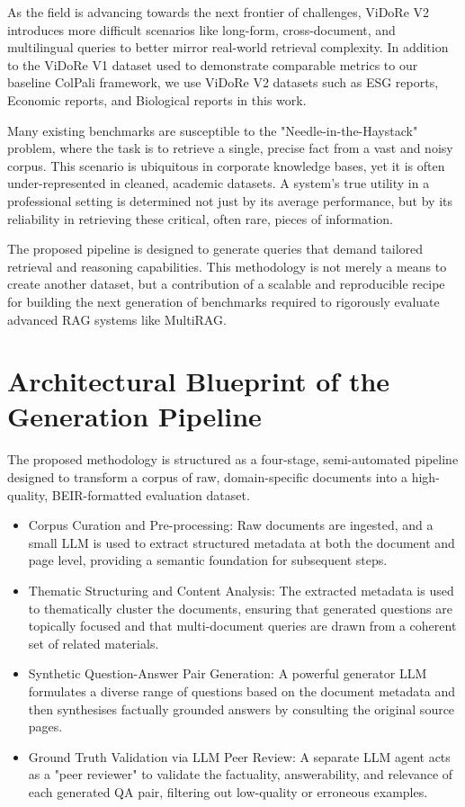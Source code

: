 \documentclass[12pt,twoside]{report}
\begin{document}
As the field is advancing towards the next frontier of challenges, ViDoRe V2 introduces more difficult scenarios like long-form, cross-document, and multilingual queries to better mirror real-world retrieval complexity. In addition to the ViDoRe V1 dataset used to demonstrate comparable metrics to our baseline ColPali framework, we use ViDoRe V2 datasets such as ESG reports, Economic reports, and Biological reports in this work.

Many existing benchmarks are susceptible to the "Needle-in-the-Haystack" problem, where the task is to retrieve a single, precise fact from a vast and noisy corpus. This scenario is ubiquitous in corporate knowledge bases, yet it is often under-represented in cleaned, academic datasets. A system's true utility in a professional setting is determined not just by its average performance, but by its reliability in retrieving these critical, often rare, pieces of information.

The proposed pipeline is designed to generate queries that demand tailored retrieval and reasoning capabilities. This methodology is not merely a means to create another dataset, but a contribution of a scalable and reproducible recipe for building the next generation of benchmarks required to rigorously evaluate advanced RAG systems like MultiRAG.

\section{Architectural Blueprint of the Generation Pipeline}

The proposed methodology is structured as a four-stage, semi-automated pipeline designed to transform a corpus of raw, domain-specific documents into a high-quality, BEIR-formatted evaluation dataset.

\begin{itemize}
\item{Corpus Curation and Pre-processing}: Raw documents are ingested, and a small LLM is used to extract structured metadata at both the document and page level, providing a semantic foundation for subsequent steps.

\item{Thematic Structuring and Content Analysis}: The extracted metadata is used to thematically cluster the documents, ensuring that generated questions are topically focused and that multi-document queries are drawn from a coherent set of related materials.

\item{Synthetic Question-Answer Pair Generation}: A powerful generator LLM formulates a diverse range of questions based on the document metadata and then synthesises factually grounded answers by consulting the original source pages.

\item{Ground Truth Validation via LLM Peer Review}: A separate LLM agent acts as a "peer reviewer" to validate the factuality, answerability, and relevance of each generated QA pair, filtering out low-quality or erroneous examples.
\end{itemize}
\end{document}
